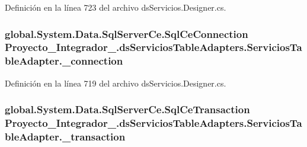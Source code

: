 Definición en la línea 723 del archivo ds\-Servicios.\-Designer.\-cs.

\hypertarget{class_proyecto___integrador__3_1_1ds_servicios_table_adapters_1_1_servicios_table_adapter_a61b17efa7b400219260090a16bfccff3}{
\subsubsection[{\-\_\-connection}]{\setlength{\rightskip}{0pt plus 5cm}global.\-System.\-Data.\-Sql\-Server\-Ce.\-Sql\-Ce\-Connection Proyecto\-\_\-\-Integrador\-\_.\-ds\-Servicios\-Table\-Adapters.\-Servicios\-Table\-Adapter.\-\_\-connection\hspace{0.3cm}{\ttfamily [private]}}}\label{class_proyecto___integrador__3_1_1ds_servicios_table_adapters_1_1_servicios_table_adapter_a61b17efa7b400219260090a16bfccff3}


Definición en la línea 719 del archivo ds\-Servicios.\-Designer.\-cs.

\hypertarget{class_proyecto___integrador__3_1_1ds_servicios_table_adapters_1_1_servicios_table_adapter_ab5265bf458c29343cad2cc1c7f49da90}{
\subsubsection[{\-\_\-transaction}]{\setlength{\rightskip}{0pt plus 5cm}global.\-System.\-Data.\-Sql\-Server\-Ce.\-Sql\-Ce\-Transaction Proyecto\-\_\-\-Integrador\-\_.\-ds\-Servicios\-Table\-Adapters.\-Servicios\-Table\-Adapter.\-\_\-transaction\hspace{0.3cm}{\ttfamily [private]}}}\label{class_proyecto___integrador__3_1_1ds_servicios_table_adapters_1_1_servicios_table_adapter_ab5265bf458c29343cad2cc1c7f49da90}


